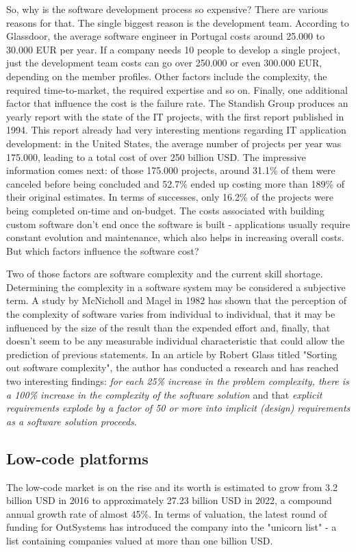 \documentclass{sigchi}
\begin{document}
So, why is the software development process so expensive? There are various reasons for that. The single biggest reason is the development team. According to Glassdoor, the average software engineer in Portugal costs around 25.000 to 30.000 EUR per year. If a company needs 10 people to develop a single project, just the development team costs can go over 250.000 or even 300.000 EUR, depending on the member profiles. Other factors include the complexity, the required time-to-market, the required expertise and so on. Finally, one additional factor that influence the cost is the failure rate. 
The Standish Group produces an yearly report with the state of the IT projects, with the first report published in 1994\cite{CHAOS1994}. This report already had very interesting mentions regarding IT application development: in the United States, the average number of projects per year was 175.000, leading to a total cost of over 250 billion USD. The impressive information comes next: of those 175.000 projects, around 31.1\% of them were canceled before being concluded and 52.7\% ended up costing more than 189\% of their original estimates. In terms of successes, only 16.2\% of the projects were being completed on-time and on-budget. The costs associated with building custom software don't end once the software is built - applications usually require constant evolution and maintenance, which also helps in increasing overall costs.
But which factors influence the software cost?

Two of those factors are software complexity and the current skill shortage. Determining the complexity in a software system may be considered a subjective term. A study by McNicholl and Magel in 1982\cite{McNicholl:1982:SNP:800049.801785} has shown that the perception of the complexity of software varies from individual to individual, that it may be influenced by the size of the result than the expended effort and, finally, that doesn't seem to be any measurable individual characteristic that could allow the prediction of  previous statements.
In an article by Robert Glass titled "Sorting out software complexity"\cite{Glass:2002:SOS:581571.581584}, the author has conducted a research and has reached two interesting findings: \textit{for each 25\% increase in the problem complexity, there is a 100\% increase in the complexity of the software solution} and that \textit{explicit requirements explode by a factor of 50 or more into implicit (design) requirements as a software solution proceeds}.

\subsection{Low-code platforms}
The low-code market is on the rise and its worth is estimated to grow from 3.2 billion USD in 2016 to approximately 27.23 billion USD in 2022, a compound annual growth rate of almost 45\%. In terms of valuation, the latest round of funding for OutSystems has introduced the company into the "unicorn list" - a list containing companies valued at more than one billion USD.
\end{document}
